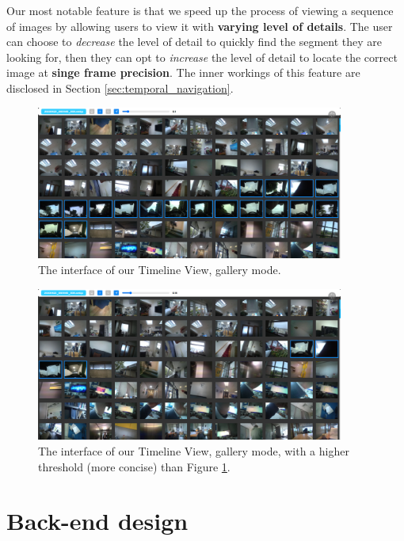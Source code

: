 Our most notable feature is that we speed up the process of viewing a sequence of images by allowing users to view it with \textbf{varying level of details}. The user can choose to \textit{decrease} the level of detail to quickly find the segment they are looking for, then they can opt to \textit{increase} the level of detail to locate the correct image at \textbf{singe frame precision}. The inner workings of this feature are disclosed in Section \ref{sec:temporal_navigation}.

\begin{figure}[H]
    \centering
    \includegraphics[width=0.9\textwidth]{content/resources/images/methods/FIRST_timeline_before.png}
    \caption{The interface of our Timeline View, gallery mode. }
    \label{fig:FIRST_timeline_before}
\end{figure}

\begin{figure}[H]
    \centering
    \includegraphics[width=0.9\textwidth]{content/resources/images/methods/FIRST_timeline_after.png}
    \caption{The interface of our Timeline View, gallery mode, with a higher threshold (more concise) than Figure \ref{fig:FIRST_timeline_before}.}
    \label{fig:FIRST_timeline_after}
\end{figure}

\section{Back-end design}
\label{sec:first_back_end_design}

